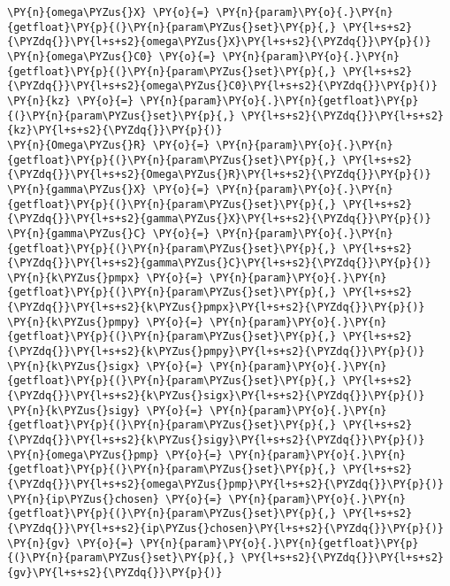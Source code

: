 \begin{Verbatim}[commandchars=\\\{\}]
\PY{n}{omega\PYZus{}X} \PY{o}{=} \PY{n}{param}\PY{o}{.}\PY{n}{getfloat}\PY{p}{(}\PY{n}{param\PYZus{}set}\PY{p}{,} \PY{l+s+s2}{\PYZdq{}}\PY{l+s+s2}{omega\PYZus{}X}\PY{l+s+s2}{\PYZdq{}}\PY{p}{)}
\PY{n}{omega\PYZus{}C0} \PY{o}{=} \PY{n}{param}\PY{o}{.}\PY{n}{getfloat}\PY{p}{(}\PY{n}{param\PYZus{}set}\PY{p}{,} \PY{l+s+s2}{\PYZdq{}}\PY{l+s+s2}{omega\PYZus{}C0}\PY{l+s+s2}{\PYZdq{}}\PY{p}{)}
\PY{n}{kz} \PY{o}{=} \PY{n}{param}\PY{o}{.}\PY{n}{getfloat}\PY{p}{(}\PY{n}{param\PYZus{}set}\PY{p}{,} \PY{l+s+s2}{\PYZdq{}}\PY{l+s+s2}{kz}\PY{l+s+s2}{\PYZdq{}}\PY{p}{)}
\PY{n}{Omega\PYZus{}R} \PY{o}{=} \PY{n}{param}\PY{o}{.}\PY{n}{getfloat}\PY{p}{(}\PY{n}{param\PYZus{}set}\PY{p}{,} \PY{l+s+s2}{\PYZdq{}}\PY{l+s+s2}{Omega\PYZus{}R}\PY{l+s+s2}{\PYZdq{}}\PY{p}{)}
\PY{n}{gamma\PYZus{}X} \PY{o}{=} \PY{n}{param}\PY{o}{.}\PY{n}{getfloat}\PY{p}{(}\PY{n}{param\PYZus{}set}\PY{p}{,} \PY{l+s+s2}{\PYZdq{}}\PY{l+s+s2}{gamma\PYZus{}X}\PY{l+s+s2}{\PYZdq{}}\PY{p}{)}
\PY{n}{gamma\PYZus{}C} \PY{o}{=} \PY{n}{param}\PY{o}{.}\PY{n}{getfloat}\PY{p}{(}\PY{n}{param\PYZus{}set}\PY{p}{,} \PY{l+s+s2}{\PYZdq{}}\PY{l+s+s2}{gamma\PYZus{}C}\PY{l+s+s2}{\PYZdq{}}\PY{p}{)}
\PY{n}{k\PYZus{}pmpx} \PY{o}{=} \PY{n}{param}\PY{o}{.}\PY{n}{getfloat}\PY{p}{(}\PY{n}{param\PYZus{}set}\PY{p}{,} \PY{l+s+s2}{\PYZdq{}}\PY{l+s+s2}{k\PYZus{}pmpx}\PY{l+s+s2}{\PYZdq{}}\PY{p}{)}
\PY{n}{k\PYZus{}pmpy} \PY{o}{=} \PY{n}{param}\PY{o}{.}\PY{n}{getfloat}\PY{p}{(}\PY{n}{param\PYZus{}set}\PY{p}{,} \PY{l+s+s2}{\PYZdq{}}\PY{l+s+s2}{k\PYZus{}pmpy}\PY{l+s+s2}{\PYZdq{}}\PY{p}{)}
\PY{n}{k\PYZus{}sigx} \PY{o}{=} \PY{n}{param}\PY{o}{.}\PY{n}{getfloat}\PY{p}{(}\PY{n}{param\PYZus{}set}\PY{p}{,} \PY{l+s+s2}{\PYZdq{}}\PY{l+s+s2}{k\PYZus{}sigx}\PY{l+s+s2}{\PYZdq{}}\PY{p}{)}
\PY{n}{k\PYZus{}sigy} \PY{o}{=} \PY{n}{param}\PY{o}{.}\PY{n}{getfloat}\PY{p}{(}\PY{n}{param\PYZus{}set}\PY{p}{,} \PY{l+s+s2}{\PYZdq{}}\PY{l+s+s2}{k\PYZus{}sigy}\PY{l+s+s2}{\PYZdq{}}\PY{p}{)}
\PY{n}{omega\PYZus{}pmp} \PY{o}{=} \PY{n}{param}\PY{o}{.}\PY{n}{getfloat}\PY{p}{(}\PY{n}{param\PYZus{}set}\PY{p}{,} \PY{l+s+s2}{\PYZdq{}}\PY{l+s+s2}{omega\PYZus{}pmp}\PY{l+s+s2}{\PYZdq{}}\PY{p}{)}
\PY{n}{ip\PYZus{}chosen} \PY{o}{=} \PY{n}{param}\PY{o}{.}\PY{n}{getfloat}\PY{p}{(}\PY{n}{param\PYZus{}set}\PY{p}{,} \PY{l+s+s2}{\PYZdq{}}\PY{l+s+s2}{ip\PYZus{}chosen}\PY{l+s+s2}{\PYZdq{}}\PY{p}{)}
\PY{n}{gv} \PY{o}{=} \PY{n}{param}\PY{o}{.}\PY{n}{getfloat}\PY{p}{(}\PY{n}{param\PYZus{}set}\PY{p}{,} \PY{l+s+s2}{\PYZdq{}}\PY{l+s+s2}{gv}\PY{l+s+s2}{\PYZdq{}}\PY{p}{)}


\end{Verbatim}
